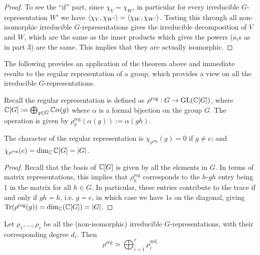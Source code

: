 \begin{corollary}
\begin{enumerate}[label=\arabic*)]
\begin{proof}
            To see the ``if'' part, since $\chi_V = \chi_W$, in particular for every irreducible $G$-representation $W'$ we have $\left\langle \chi_V, \chi_{W'} \right\rangle = \left\langle \chi_W, \chi_{W'} \right\rangle$. Testing this through all non-isomorphic irreducible $G$-representations gives the irreducible decomposition of $V$ and $W$, which are the same as the inner products which gives the powers ($a_i$s as in part 3) are the same. This implies that they are actually isomorphic. 
        \end{proof}
    \end{enumerate}
\end{corollary}

\textstart
The following provides an application of the theorem above and immediate results to the regular representation of a group, which provides a view on all the irreducible $G$-representations.

Recall the regular representation is defined as $\rho^{\mathrm{reg}}: G \to \mathrm{GL}(\mathbb{C}[G])$, where $\mathbb{C}[G] := \bigoplus_{g \in G} \mathbb{C} \alpha(g)$ where $\alpha$ is a formal bijection on the group $G$. The operation is given by $\rho^{\mathrm{reg}}_h (\alpha(g)) := \alpha(gh)$.

\begin{lemma}
    The character of the regular representation is $\chi_{\rho^{\mathrm{reg}}}(g) = 0$ if $g \neq e$; and $\chi_{\rho^{\mathrm{reg}}}(e) = \dim_{\mathbb{C}}\mathbb{C}[G] = \left|G\right|$.
\end{lemma}

\begin{proof}
    Recall that the basis of $\mathbb{C}[G]$ is given by all the elements in $G$. In terms of matrix representations, this implies that $\rho^{\mathrm{reg}}_h$ corresponds to the $h$-$gh$ entry being 1 in the matrix for all $h \in G$. In particular, these entries contribute to the trace if and only if $gh = h$, i.e. $g = e$, in which case we have $1$s on the diagonal, giving $\operatorname{Tr}(\rho^{\mathrm{reg}}(g)) = \dim_{\mathbb{C}}(\mathbb{C}[G]) = \left|G\right|$.
\end{proof}

\begin{proposition}\label{prop: decomposition of regular repr.}
    Let $\rho_1, \dots, \rho_r$ be all the (non-isomorphic) irreducible $G$-representations, with their corresponding degree $d_i$. Then 
    \[
        \rho^{\mathrm{reg}} \simeq \bigoplus_{i = 1}^r \rho_i^{\oplus d_i}
    \]
\end{proposition}

